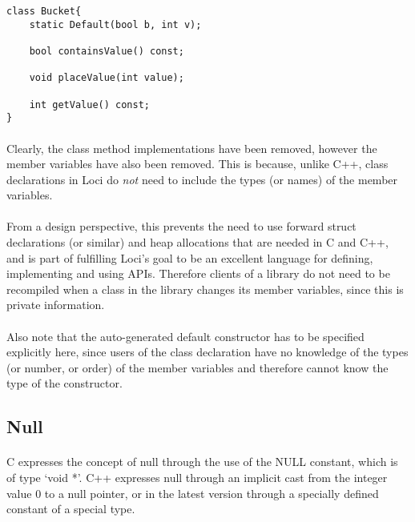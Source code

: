 \documentclass[12pt,twoside,notitlepage]{report}
\begin{document}
\begin{lstlisting}
class Bucket{
	static Default(bool b, int v);

	bool containsValue() const;
	
	void placeValue(int value);
	
	int getValue() const;
}
\end{lstlisting}


\paragraph{}
Clearly, the class method implementations have been removed, however the member variables have also been removed. This is because, unlike C++, class declarations in Loci do \emph{not} need to include the types (or names) of the member variables.

\paragraph{}
From a design perspective, this prevents the need to use forward struct declarations (or similar) and heap allocations that are needed in C and C++, and is part of fulfilling Loci's goal to be an excellent language for defining, implementing and using APIs. Therefore clients of a library do not need to be recompiled when a class in the library changes its member variables, since this is private information.

\paragraph{}
Also note that the auto-generated default constructor has to be specified explicitly here, since users of the class declaration have no knowledge of the types (or number, or order) of the member variables and therefore cannot know the type of the constructor.

\clearpage

\subsection{Null}

\paragraph{}
C expresses the concept of null through the use of the NULL constant, which is of type `void *'. C++ expresses null through an implicit cast from the integer value 0 to a null pointer, or in the latest version through a specially defined constant of a special type.
\end{document}

